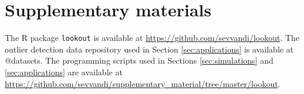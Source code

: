\documentclass[
]{article}
\begin{document}
\hypertarget{sec:suppmat}{%
\section{Supplementary materials}\label{sec:suppmat}}

The R package \texttt{lookout} is available at
\url{https://github.com/sevvandi/lookout}. The outlier detection data
repository used in Section \ref{sec:applications} is available at
@datasets. The programming scripts used in Sections
\ref{sec:simulations} and \ref{sec:applications} are available at
\url{https://github.com/sevvandi/supplementary_material/tree/master/lookout}.
\end{document}
